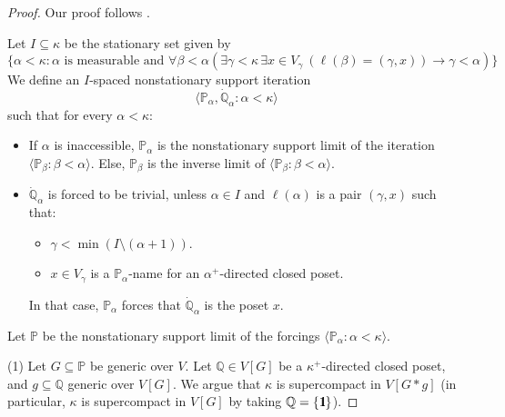 \documentclass[11pt]{amsart}
\theoremstyle{definition}
\theoremstyle{remark}
\newcommand\<{{<}}
\newcommand{\one}{\mathop{1\hskip-3pt {\rm l}}}
\def\s{\subseteq}
\newcommand{\po}{\mathbb{P}}
\newcommand{\qo}{\mathbb{Q}}
\newcommand{\la}{\langle}
\newcommand{\ra}{\rangle}
\begin{document}
    \begin{proof}
    Our proof follows \cite[Theorem 24.12]{CummingsHandbook}. 
    
    Let $I\s \kappa$ be the stationary set given by    $$\{ \alpha<\kappa \colon \alpha \text{ is measurable and } \forall \beta<\alpha \left( \exists \gamma<\kappa\, \exists x\in V_\gamma \ \left( \ell(\beta) = (\gamma,x) \right) \to \gamma< \alpha \right) \}$$
    We define an $I$-spaced nonstationary support iteration $$\la \po_\alpha,  \dot{\qo}_\alpha\colon \alpha<\kappa \ra$$ such that for every $\alpha<\kappa$:
    \begin{itemize}
        \item If $\alpha$ is inaccessible, $\po_\alpha$ is the nonstationary support limit of the iteration $\la \po_\beta \colon \beta < \alpha \ra$. Else, $\po_\beta$ is the inverse limit of $\la \po_\beta \colon \beta<\alpha \ra$.
        \item $\dot{\qo}_\alpha$ is forced to be trivial, unless $\alpha\in I$ and $\ell(\alpha)$ is a pair $\left( \gamma, x \right)$ such that:
        \begin{itemize}
            \item $\gamma < \min(I\setminus (\alpha+1))$.
            \item $x\in V_\gamma$ is a $\po_\alpha$-name for an $\alpha^+$-directed closed poset.
        \end{itemize}
        In that case, $\po_\alpha$ forces that $\dot{\qo}_\alpha$ is the poset $x$.
    \end{itemize}
    Let $\po$ be the nonstationary support limit of the forcings $\la \po_\alpha \colon \alpha<\kappa \ra$. 

    \smallskip

    (1) Let $G\subseteq \po$ be generic over $V$.  Let $\qo\in V[G]$ be a $\kappa^+$-directed closed poset, and $g\subseteq \qo$ generic over $V[G]$. We argue that $\kappa$ is supercompact in $V[G\ast g]$ (in particular, $\kappa$ is supercompact in $V[G]$ by taking $\qo=\{\one \}$). 


\end{proof}
\end{document}
